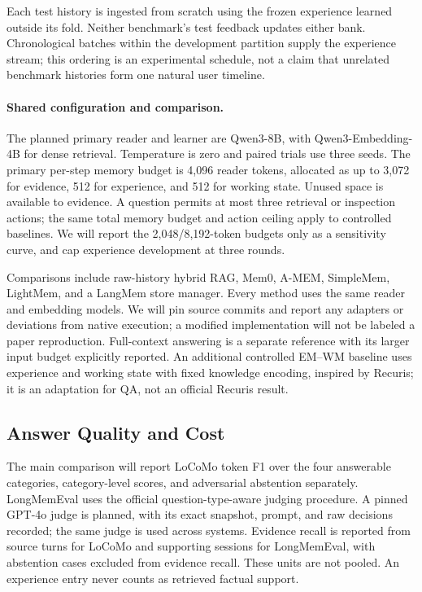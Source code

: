 \documentclass{article}
\begin{document}
Each test history is ingested from scratch using the frozen experience learned
outside its fold. Neither benchmark's test feedback updates either bank.
Chronological batches within the development partition supply the experience
stream; this ordering is an experimental schedule, not a claim that unrelated
benchmark histories form one natural user timeline.

\paragraph{Shared configuration and comparison.}
The planned primary reader and learner are Qwen3-8B, with Qwen3-Embedding-4B
for dense retrieval. Temperature is zero and paired trials use three seeds.
The primary per-step memory budget is 4,096 reader tokens, allocated as up to
3,072 for evidence, 512 for experience, and 512 for working state. Unused space
is available to evidence. A question permits at most three retrieval or
inspection actions; the same total memory budget and action ceiling apply to
controlled baselines. We will report the 2,048/8,192-token budgets only as a
sensitivity curve, and cap experience development at three rounds.

Comparisons include raw-history hybrid RAG, Mem0, A-MEM, SimpleMem, LightMem,
and a LangMem store manager. Every method uses the same reader and embedding
models. We will pin source commits and report any adapters or deviations from
native execution; a modified implementation will not be labeled a paper
reproduction. Full-context answering is a separate reference with its larger
input budget explicitly reported. An additional controlled EM--WM baseline
uses experience and working state with fixed knowledge encoding, inspired by
Recuris; it is an adaptation for QA, not an official Recuris result.

\subsection{Answer Quality and Cost}
The main comparison will report LoCoMo token F1 over the four answerable
categories, category-level scores, and adversarial abstention separately.
LongMemEval uses the official question-type-aware judging procedure. A pinned
GPT-4o judge is planned, with its exact snapshot, prompt, and raw decisions
recorded; the same judge is used across systems. Evidence recall is reported
from source turns for LoCoMo and supporting sessions for LongMemEval, with
abstention cases excluded from evidence recall. These units are not pooled.
An experience entry never counts as retrieved factual support.
\end{document}
